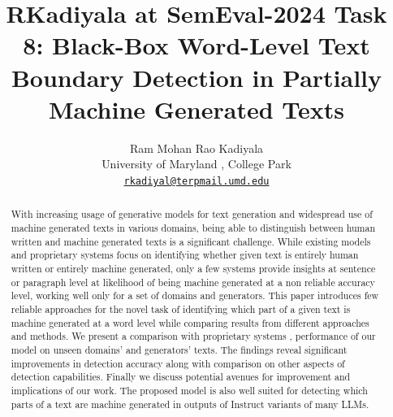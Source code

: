\documentclass[11pt]{article}
\title{RKadiyala at SemEval-2024 Task 8: Black-Box Word-Level Text Boundary Detection in Partially Machine Generated Texts}
\author{Ram Mohan Rao Kadiyala \\
  University of Maryland , College Park \\
  \href{mailto:rkadiyal@terpmail.umd.edu}{\texttt{rkadiyal@terpmail.umd.edu}} \\}
\begin{document}
\maketitle
\begin{abstract}
With increasing usage of generative models for text generation and widespread use of machine generated texts in various domains, being able to distinguish between human written and machine generated texts is a significant challenge. While existing models and proprietary systems focus on identifying whether given text is entirely human written or entirely machine generated, only a few systems provide insights at sentence or paragraph level at likelihood of being machine generated at a non reliable accuracy level, working well only for a set of domains and generators. This paper introduces few reliable approaches for the novel task of identifying which part of a given text is machine generated at a word level while comparing results from different approaches and methods. We present a comparison with proprietary systems , performance of our model on unseen domains' and generators' texts. The findings reveal significant improvements in detection accuracy along with comparison on other aspects of detection capabilities. Finally we discuss potential avenues for improvement and implications of our work. The proposed model is also well suited for detecting which parts of a text are machine generated in outputs of Instruct variants of many LLMs. 
\end{abstract}
\end{document}
